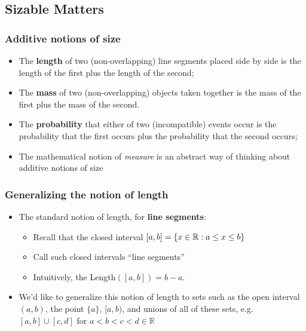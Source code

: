 \subsection{Sizable Matters}

\begin{frame}
\frametitle{Additive notions of size}

\begin{itemize}[<+->]

\item The \textbf{length} of two (non-overlapping) line segments placed side by side is the length of the first plus the length of the second; 

\item The \textbf{mass} of two (non-overlapping) objects taken together is the mass of the first plus the mass of the second. 

\item The \textbf{probability} that either of two (incompatible) events occur is the probability that the first occurs plus the probability that the second occurs; 

\item The mathematical notion of \emph{measure} is an abstract way of thinking about additive notions of size


\end{itemize}
\end{frame}

\begin{frame}
\frametitle{Generalizing the notion of length}

\begin{itemize}[<+->]

\item The standard notion of length, for \textbf{line segments}:
\begin{itemize}
\item Recall that the closed interval $[a,b] = \left\{ {x \in \mathbb{R} : a \leq x \leq b} \right\}$

\item Call such closed intervals ``line segments''

\item Intuitively, the Length$\left([a,b]\right) = b - a$.
\end{itemize}

\bigskip

\item We'd like to generalize this notion of length to sets such as the open interval $(a, b)$, the point $\{ a \}$, $[a, b)$, and unions of all of these sets, e.g. $[a, b] \cup [c, d]$ for $a < b< c < d \in \mathbb{R}$


\end{itemize}
\end{frame}

